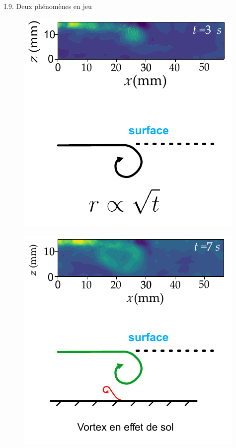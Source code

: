 \documentclass[aspectratio=169,10pt]{beamer}
\begin{document}
\begin{frame}{I.9. Deux phénomènes en jeu}
    \begin{multicols}{2}
        \begin{figure}
            \includegraphics[scale=1]{./figures/schema_enroulement_proche_surface.pdf}
        \end{figure}
        \begin{figure}
            \includegraphics[scale=1]{./figures/schema_enroulement_proche_surface_2.pdf}    
        \end{figure}
    \end{multicols}

\end{frame}
\end{document}
